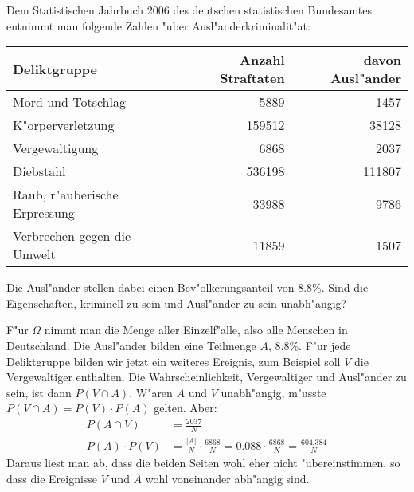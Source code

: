 Dem Statistischen Jahrbuch 2006 des deutschen statistischen Bundesamtes
entnimmt man folgende Zahlen "uber Ausl"anderkriminalit"at:
\begin{center}
\begin{tabular}{|l|r|r|}
\hline
Deliktgruppe&Anzahl Straftaten&davon Ausl"ander\\
\hline
Mord und Totschlag           &  5889&  1457\\
K"orperverletzung            &159512& 38128\\
Vergewaltigung               &  6868&  2037\\
Diebstahl                    &536198&111807\\
Raub, r"auberische Erpressung& 33988&  9786\\
Verbrechen gegen die Umwelt  & 11859&  1507\\
\hline
\end{tabular}
\end{center}
Die Ausl"ander stellen dabei einen Bev"olkerungsanteil von 8.8\%.
Sind die Eigenschaften, kriminell zu sein und Ausl"ander zu sein
unabh"angig?

\begin{loesung}
F"ur $\Omega$ nimmt man die Menge aller Einzelf"alle, also alle
Menschen in Deutschland. Die Ausl"ander bilden eine Teilmenge $A$,
8.8\%. F"ur jede Deliktgruppe bilden wir jetzt ein weiteres Ereignis,
zum Beispiel soll $V$ die Vergewaltiger enthalten. Die Wahrscheinlichkeit,
Vergewaltiger und Ausl"ander zu sein, ist dann $P(V\cap A)$. W"aren
$A$ und $V$ unabh"angig, m"usste $P(V\cap A)=P(V)\cdot P(A)$ gelten.
Aber:
\begin{align*}
P(A\cap V)&=\frac{2037}{N}\\
P(A)\cdot P(V)&=\frac{|A|}{N}\cdot\frac{6868}{N}=0.088\cdot \frac{6868}{N}=\frac{604.384}{N}
\end{align*}
Daraus liest man ab, dass die beiden Seiten wohl eher nicht "ubereinstimmen,
so dass die Ereignisse $V$ und $A$ wohl voneinander abh"angig sind.
\end{loesung}


